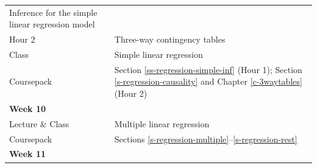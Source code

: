 \documentclass[11pt,a4paper,openany]{book}
\begin{document}
\begin{longtable}[]{@{}ll@{}}
\begin{minipage}[t]{0.76\columnwidth}
Inference for the simple linear regression model\strut
\end{minipage}\tabularnewline
\begin{minipage}[t]{0.19\columnwidth}\raggedright\strut
Hour 2\strut
\end{minipage} & \begin{minipage}[t]{0.76\columnwidth}\raggedright\strut
Three-way contingency tables\strut
\end{minipage}\tabularnewline
\begin{minipage}[t]{0.19\columnwidth}\raggedright\strut
Class\strut
\end{minipage} & \begin{minipage}[t]{0.76\columnwidth}\raggedright\strut
Simple linear regression\strut
\end{minipage}\tabularnewline
\begin{minipage}[t]{0.19\columnwidth}\raggedright\strut
Coursepack\strut
\end{minipage} & \begin{minipage}[t]{0.76\columnwidth}\raggedright\strut
Section \ref{ss-regression-simple-inf} (Hour 1); Section
\ref{s-regression-causality} and Chapter \ref{c-3waytables} (Hour
2)\strut
\end{minipage}\tabularnewline
\begin{minipage}[t]{0.19\columnwidth}\raggedright\strut
\textbf{Week 10}\strut
\end{minipage} & \begin{minipage}[t]{0.76\columnwidth}\raggedright\strut
\strut
\end{minipage}\tabularnewline
\begin{minipage}[t]{0.19\columnwidth}\raggedright\strut
Lecture \& Class\strut
\end{minipage} & \begin{minipage}[t]{0.76\columnwidth}\raggedright\strut
Multiple linear regression\strut
\end{minipage}\tabularnewline
\begin{minipage}[t]{0.19\columnwidth}\raggedright\strut
Coursepack\strut
\end{minipage} & \begin{minipage}[t]{0.76\columnwidth}\raggedright\strut
Sections \ref{s-regression-multiple}--\ref{s-regression-rest}\strut
\end{minipage}\tabularnewline
\begin{minipage}[t]{0.19\columnwidth}\raggedright\strut
\textbf{Week 11}\strut
\end{minipage} & \begin{minipage}[t]{0.76\columnwidth}\raggedright\strut

\end{minipage}
\end{longtable}
\end{document}
